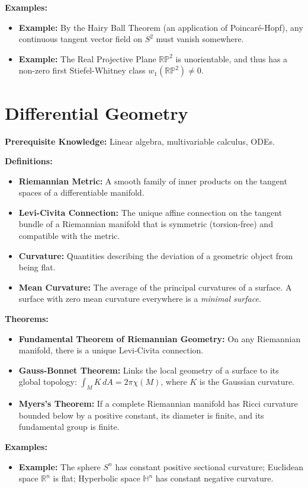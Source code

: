 \textbf{Examples:}
\begin{itemize}
    \item \textbf{Example:} By the Hairy Ball Theorem (an application of Poincar\'e-Hopf), any continuous tangent vector field on $S^2$ must vanish somewhere.
    \item \textbf{Example:} The Real Projective Plane $\mathbb{RP}^2$ is unorientable, and thus has a non-zero first Stiefel-Whitney class $w_1(\mathbb{RP}^2) \neq 0$.
\end{itemize}

\section{Differential Geometry}
\textbf{Prerequisite Knowledge:} Linear algebra, multivariable calculus, ODEs.

\textbf{Definitions:}
\begin{itemize}
    \item \textbf{Riemannian Metric:} A smooth family of inner products on the tangent spaces of a differentiable manifold.
    \item \textbf{Levi-Civita Connection:} The unique affine connection on the tangent bundle of a Riemannian manifold that is symmetric (torsion-free) and compatible with the metric.
    \item \textbf{Curvature:} Quantities describing the deviation of a geometric object from being flat.
    \item \textbf{Mean Curvature:} The average of the principal curvatures of a surface. A surface with zero mean curvature everywhere is a \textit{minimal surface}.
\end{itemize}

\textbf{Theorems:}
\begin{itemize}
    \item \textbf{Fundamental Theorem of Riemannian Geometry:} On any Riemannian manifold, there is a unique Levi-Civita connection.
    \item \textbf{Gauss-Bonnet Theorem:} Links the local geometry of a surface to its global topology: $\int_{M} K \,dA = 2\pi \chi(M)$, where $K$ is the Gaussian curvature.
    \item \textbf{Myers's Theorem:} If a complete Riemannian manifold has Ricci curvature bounded below by a positive constant, its diameter is finite, and its fundamental group is finite.
\end{itemize}

\textbf{Examples:}
\begin{itemize}
    \item \textbf{Example:} The sphere $S^n$ has constant positive sectional curvature; Euclidean space $\mathbb{R}^n$ is flat; Hyperbolic space $\mathbb{H}^n$ has constant negative curvature.
\end{itemize}

